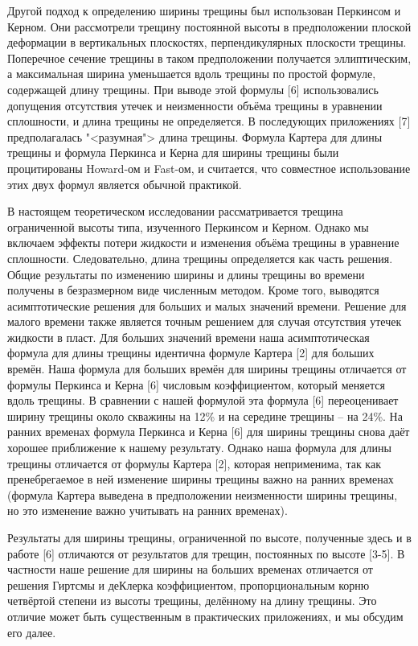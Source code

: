 \documentclass[a4paper, 12pt]{article}
\begin{document}
Другой подход к определению ширины трещины был использован Перкинсом и Керном.
Они рассмотрели трещину постоянной высоты в предположении плоской деформации в вертикальных плоскостях, перпендикулярных плоскости трещины.
Поперечное сечение трещины в таком предположении получается эллиптическим, а максимальная ширина уменьшается вдоль трещины по простой формуле, содержащей длину трещины.
При выводе этой формулы [6] использовались допущения отсутствия утечек и неизменности объёма трещины в уравнении сплошности, и длина трещины не определяется.
В последующих приложениях [7] предполагалась "<разумная"> длина трещины.
Формула Картера для длины трещины и формула Перкинса и Керна для ширины трещины были процитированы Howard-ом и Fast-ом, и считается, что совместное использование этих двух формул является обычной практикой.

В настоящем теоретическом исследовании рассматривается трещина ограниченной высоты типа, изученного Перкинсом и Керном.
Однако мы включаем эффекты потери жидкости и изменения объёма трещины в уравнение сплошности.
Следовательно, длина трещины определяется как часть решения.
Общие результаты по изменению ширины и длины трещины во времени получены в безразмерном виде численным методом.
Кроме того, выводятся асимптотические решения для больших и малых значений времени.
Решение для малого времени также является точным решением для случая отсутствия утечек жидкости в пласт.
Для больших значений времени наша асимптотическая формула для длины трещины идентична формуле Картера [2] для больших времён.
Наша формула для больших времён для ширины трещины отличается от формулы Перкинса и Керна [6] числовым коэффициентом, который меняется вдоль трещины.
В сравнении с нашей формулой эта формула [6] переоценивает ширину трещины около скважины на 12\% и на середине трещины -- на 24\%. 
На ранних временах формула Перкинса и Керна [6] для ширины трещины снова даёт хорошее приближение к нашему результату.
Однако наша формула для длины трещины отличается от формулы Картера [2], которая неприменима, так как пренебрегаемое в ней изменение ширины трещины важно на ранних временах (формула Картера выведена в предположении неизменности ширины трещины, но это изменение важно учитывать на ранних временах).

Результаты для ширины трещины, ограниченной по высоте, полученные здесь и в работе [6] отличаются от результатов для трещин, постоянных по высоте [3-5].
В частности наше решение для ширины на больших временах отличается от решения Гиртсмы и деКлерка коэффициентом, пропорциональным корню четвёртой степени из высоты трещины, делённому на длину трещины.
Это отличие может быть существенным в практических приложениях, и мы обсудим его далее.
\end{document}
